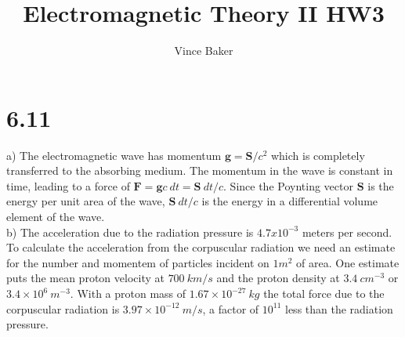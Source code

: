 \documentclass[a4paper,11pt]{article}
\title{Electromagnetic Theory II HW3}
\author{Vince Baker}
\numberwithin{equation}{section}
\newcommand{\bv}[1]{\mathbf{#1}}
\begin{document}
\maketitle

\section*{6.11}
a) The electromagnetic wave has momentum $\bv{g} = \bv{S}/c^2$ which is completely transferred to the absorbing medium. 
The momentum in the wave is constant in time, leading to a force of $\bv{F} = \bv{g}c\ dt = \bv{S}\ dt/c$.
Since the Poynting vector $\bv{S}$ is the energy per unit area of the wave, $\bv{S}\ dt/c$ is the energy in a differential volume element of the wave.\\
b) The acceleration due to the radiation pressure is $4.7x10^{-3}$ meters per second. 
To calculate the acceleration from the corpuscular radiation we need an estimate for the number and momentem of particles incident on $1 m^2$ of area.
One estimate puts the mean proton velocity at $700\ km/s$ and the proton density at $3.4\ cm^{-3}$ or $3.4\times 10^6\ m^{-3}$.
With a proton mass of $1.67\times 10^{-27}\ kg$ the total force due to the corpuscular radiation is $3.97\times 10^{-12}\ m/s$, a factor of $10^{11}$ less than the radiation pressure.
\end{document}
